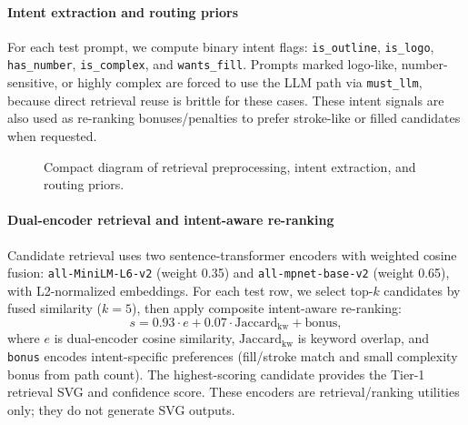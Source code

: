 \documentclass[11pt]{article}
\begin{document}
\paragraph{Intent extraction and routing priors}
For each test prompt, we compute binary intent flags: \texttt{is\_outline}, \texttt{is\_logo}, \texttt{has\_number}, \texttt{is\_complex}, and \texttt{wants\_fill}.
Prompts marked logo-like, number-sensitive, or highly complex are forced to use the LLM path via \texttt{must\_llm}, because direct retrieval reuse is brittle for these cases.
These intent signals are also used as re-ranking bonuses/penalties to prefer stroke-like or filled candidates when requested.

\begin{figure}[!ht]
    \centering
    \footnotesize
    \caption{Compact diagram of retrieval preprocessing, intent extraction, and routing priors.}
    \label{fig:retrieval-preprocess-flow}
\end{figure}
\FloatBarrier

\paragraph{Dual-encoder retrieval and intent-aware re-ranking}
Candidate retrieval uses two sentence-transformer encoders with weighted cosine fusion:
\texttt{all-MiniLM-L6-v2} (weight 0.35) and \texttt{all-mpnet-base-v2} (weight 0.65), with L2-normalized embeddings.
For each test row, we select top-$k$ candidates by fused similarity ($k=5$), then apply composite intent-aware re-ranking:
\[
s = 0.93 \cdot e + 0.07 \cdot \mathrm{Jaccard}_{\mathrm{kw}} + \mathrm{bonus},
\]
where $e$ is dual-encoder cosine similarity, $\mathrm{Jaccard}_{\mathrm{kw}}$ is keyword overlap, and \texttt{bonus} encodes intent-specific preferences (fill/stroke match and small complexity bonus from path count).
The highest-scoring candidate provides the Tier-1 retrieval SVG and confidence score.
These encoders are retrieval/ranking utilities only; they do not generate SVG outputs.
\end{document}
